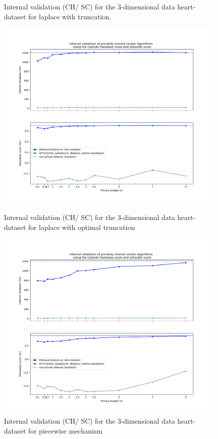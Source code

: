\begin{figure}[H]
\begin{minipage}[c]{0.49\textwidth}
        \caption{Internal validation (CH/ SC) for the 3-dimensional data heart-dataset for laplace with truncation.}
        \label{fig:appendix-internal-validation-heart-dataset_comparison_3d-laplace-truncated}
    \end{minipage}
    \begin{minipage}[c]{0.49\textwidth}
        \includegraphics[width=1\textwidth]{Results/3d-laplace-optimal-truncated/heart-dataset/ch-and-sc.png}
        \caption{Internal validation (CH/ SC) for the 3-dimensional data heart-dataset for laplace with optimal truncation}
        \label{fig:appendix-internal-validation-heart-dataset_comparison_3d-laplace-optimal-truncated}
    \end{minipage}
    \begin{minipage}[c]{0.49\textwidth}
        \includegraphics[width=1\textwidth]{Results/3d-piecewise/heart-dataset/ch-and-sc.png}
        \caption{Internal validation (CH/ SC) for the 3-dimensional data heart-dataset for piecewise mechanism}
        \label{fig:appendix-internal-validation-heart-dataset_comparison_3d-piecewise}
    \end{minipage}
\end{figure}
